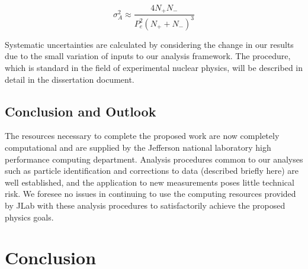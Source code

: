 \begin{equation}
  \sigma_A^2 \approx \frac{4N_+N_-}{P_e^2 (N_+ + N_-)^3} 
\end{equation}

Systematic uncertainties are calculated by considering the change in our results due to the small variation of inputs to our analysis framework.  The procedure, which is standard in the field of experimental nuclear physics, will be described in detail in the dissertation document.  

\subsection{Conclusion and Outlook}
The resources necessary to complete the proposed work are now completely computational and are supplied by the Jefferson national laboratory high performance computing department.  Analysis procedures common to our analyses such as particle identification and corrections to data (described briefly here) are well established, and the application to new measurements poses little technical risk.  We foresee no issues in continuing to use the computing resources provided by JLab with these analysis procedures to satisfactorily achieve the proposed physics goals.  

\section{Conclusion}

